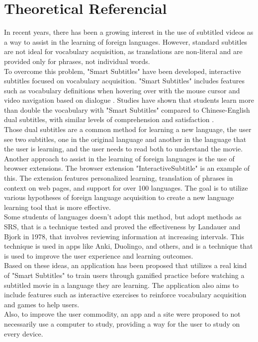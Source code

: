 \documentclass[12pt]{article}
\begin{document}
\section{Theoretical Referencial}
In recent years, there has been a growing interest in the use of subtitled videos as a way to assist in the learning of foreign languages. However, standard subtitles are not ideal for vocabulary acquisition, as translations are non-literal and are provided only for phrases, not individual words. \\
To overcome this problem, "Smart Subtitles" have been developed, interactive subtitles focused on vocabulary acquisition. "Smart Subtitles" includes features such as vocabulary definitions when hovering over with the mouse cursor and video navigation based on dialogue \cite{Kovacs13}. Studies have shown that students learn more than double the vocabulary with "Smart Subtitles" compared to Chinese-English dual subtitles, with similar levels of comprehension and satisfaction \cite{Kovacs14}. \\ 
Those dual subtitles are a common method for learning a new language, the user see two subtitles, one in the original language and another in the language that the user is learning, and the user needs to read both to understand the movie. \\
Another approach to assist in the learning of foreign languages is the use of browser extensions. The browser extension "InteractiveSubtitle" \cite{ElBatanony21} is an example of this. The extension features personalized learning, translation of phrases in context on web pages, and support for over 100 languages. The goal is to utilize various hypotheses of foreign language acquisition to create a new language learning tool that is more effective. \\ 
Some students of languages doesn't adopt this method, but adopt methods as SRS, that is a technique tested and proved the effectiveness by Landauer and Bjork in 1978, that involves reviewing information at increasing intervals. This technique is used in apps like Anki, Duolingo, and others, and is a technique that is used to improve the user experience and learning outcomes. \\
Based on these ideas, an application has been proposed that utilizes a real kind of "Smart Subtitles" to train users through gamified practice before watching a subtitled movie in a language they are learning. The application also aims to include features such as interactive exercises to reinforce vocabulary acquisition and games to help users.  \\
Also, to improve the user commodity, an app and a site were proposed to not necessarily use a computer to study, providing a way for the user to study on every device. 
\end{document}
